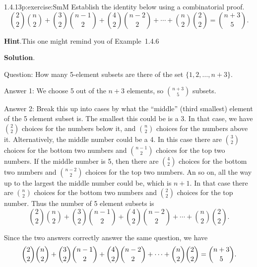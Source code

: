 \documentclass[twoside,11pt,]{book}
\newcommand{\blocktitlefont}{\relax}
\newcommand{\qedhere}{\relax}
\numberwithin{equation}{chapter}
\begin{document}
\begin{divisionsolution}{1.4.13}{}{p:exercise:SmM}%
Establish the identity below using a combinatorial proof.%
\begin{equation*}
{2 \choose 2}{n \choose 2} + {3 \choose 2}{n-1 \choose 2} + {4\choose 2}{n-2 \choose 2} + \cdots + {n\choose 2}{2\choose 2} = {n+3 \choose 5}\text{.}
\end{equation*}
%
\par\smallskip%
\noindent\textbf{\blocktitlefont Hint}.\quad{}This one might remind you of Example~1.4.6%
\par\smallskip%
\noindent\textbf{\blocktitlefont Solution}.\quad{}\begin{solutionproof}
Question: How many 5-element subsets are there of the set \(\{1,2,\ldots,
n+3\}\).%
\par
Answer 1: We choose 5 out of the \(n+3\) elements, so \({n+3 \choose 5}\) subsets.%
\par
Answer 2: Break this up into cases by what the ``middle'' (third smallest) element of the 5 element subset is. The smallest this could be is a 3. In that case, we have \({2 \choose 2}\) choices for the numbers below it, and \({n \choose 2}\) choices for the numbers above it. Alternatively, the middle number could be a 4. In this case there are \({3 \choose 2}\) choices for the bottom two numbers and \({n-1 \choose 2}\) choices for the top two numbers. If the middle number is 5, then there are \({4 \choose 2}\) choices for the bottom two numbers and \({n-2 \choose 2}\) choices for the top two numbers. An so on, all the way up to the largest the middle number could be, which is \(n+1\). In that case there are \({n \choose 2}\) choices for the bottom two numbers and \({2 \choose 2}\) choices for the top number. Thus the number of 5 element subsets is%
\begin{equation*}
{2 \choose 2}{n \choose 2} + {3 \choose 2}{n-1 \choose 2} + {4\choose 2}{n-2 \choose 2} + \cdots + {n\choose 2}{2\choose 2}\text{.}
\end{equation*}
%
\par
Since the two answers correctly answer the same question, we have%
\begin{equation*}
{2 \choose 2}{n \choose 2} + {3 \choose 2}{n-1 \choose 2} + {4\choose 2}{n-2 \choose 2} + \cdots + {n\choose 2}{2\choose 2} = {n+3 \choose 5}\text{.}\qedhere
\end{equation*}
%
\end{solutionproof}
\end{divisionsolution}%
\end{document}

